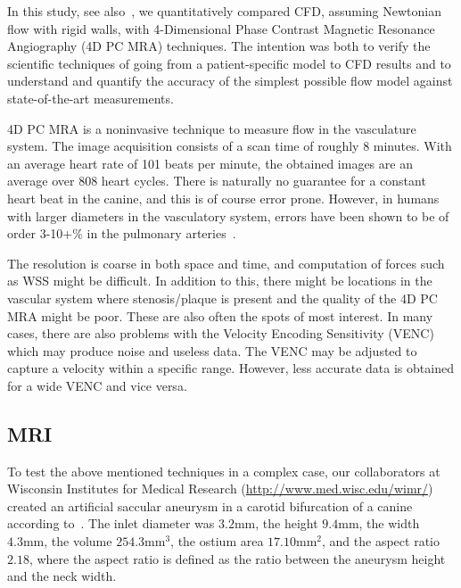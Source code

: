 In this study, see also~\cite{JiangJohnsonValen-SendstadEtAl2010}, we quantitatively compared CFD,
assuming Newtonian flow with rigid walls, with 4-Dimensional Phase
Contrast Magnetic Resonance Angiography (4D PC MRA) techniques. The
intention was both to verify the scientific techniques of going from a
patient-specific model to CFD results and to understand and quantify
the accuracy of the simplest possible flow model against
state-of-the-art measurements.

4D PC MRA is a noninvasive technique to measure flow in the
vasculature system. The image acquisition consists of a scan time of
roughly 8 minutes. With an average heart rate of 101 beats per minute,
the obtained images are an average over 808 heart cycles. There is
naturally no guarantee for a constant heart beat in the canine, and
this is of course error prone. However, in humans with larger
diameters in the vasculatory system, errors have been shown to be of
order 3-10+\% in the pulmonary arteries~\cite{LotzMeierLeppertEtAl2002,EvansAJ}.

The resolution is coarse in both space and time, and computation of
forces such as WSS might be difficult. In addition to this, there
might be locations in the vascular system where stenosis/plaque is
present and the quality of the 4D PC MRA might be poor. These are
also often the spots of most interest. In many cases, there are also
problems with the Velocity Encoding Sensitivity (VENC) which may
produce noise and useless data. The VENC may be adjusted to capture a
velocity within a specific range. However, less accurate data is
obtained for a wide VENC and vice versa.

\subsection{MRI}

To test the above mentioned techniques in a complex case, our
collaborators at Wisconsin Institutes for Medical Research
(\url{http://www.med.wisc.edu/wimr/}) created an artificial saccular
aneurysm in a carotid bifurcation of a canine according
to~\cite{GermanBlack1965}. The inlet diameter was $3.2 \mathrm{mm}$, the height
$9.4 \mathrm{mm}$, the width $4.3 \mathrm{mm}$, the volume $254.3
\mathrm{mm}^3$, the ostium area $17.10 \mathrm{mm}^2$, and the aspect
ratio $2.18$, where the aspect ratio is defined as the ratio between
the aneurysm height and the neck width.

